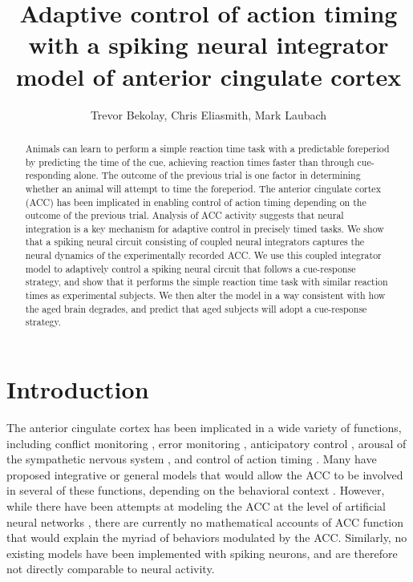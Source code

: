 \documentclass[11pt]{article}
\title{Adaptive control of action timing with a spiking neural integrator
  model of anterior cingulate cortex}
\date{}
\author{Trevor Bekolay, Chris Eliasmith, Mark Laubach}
\begin{document}
\maketitle

\begin{abstract}
  Animals can learn to perform a simple reaction time task
  with a predictable foreperiod
  by predicting the time of the cue,
  achieving reaction times faster
  than through cue-responding alone.
  The outcome of the previous trial
  is one factor in determining
  whether an animal will attempt to time
  the foreperiod.
  The anterior cingulate cortex (ACC) has been implicated
  in enabling control of action timing
  depending on the outcome of the previous trial.
  Analysis of ACC activity suggests that
  neural integration is a key mechanism
  for adaptive control in precisely timed tasks.
  We show that a spiking neural circuit
  consisting of coupled neural integrators
  captures the neural dynamics
  of the experimentally recorded ACC.
  We use this coupled integrator model
  to adaptively control
  a spiking neural circuit that follows
  a cue-response strategy,
  and show that it performs the simple reaction time task
  with similar reaction times as experimental subjects.
  We then alter the model
  in a way consistent with
  how the aged brain degrades,
  and predict that aged subjects
  will adopt a cue-response strategy.
\end{abstract}

\section{Introduction}

The anterior cingulate cortex has been implicated
in a wide variety of functions,
including conflict monitoring
\citep{Aarts2009, Botvinick2004, VanVeen2004},
error monitoring \citep{Brown2005, Carter1998, Fecteau2003,
  Modirrousta2008, Rushworth2004},
anticipatory control \citep{Aarts2008, Koyama2001},
arousal of the sympathetic nervous system
\citep{Critchley2003, Luu2003},
and control of action timing \citep{Muir1996, Mulert2003,
  Naito2013, Narayanan2009, Risterucci2003}.
Many have proposed integrative or general models
that would allow the ACC to be involved
in several of these functions,
depending on the behavioral context
\citep{Botvinick2004, Luu2003}.
However, while there have been
attempts at modeling the ACC at the level
of artificial neural networks
\citep{Botvinick2004, Brown2005},
there are currently no mathematical
accounts of ACC function that would
explain the myriad of behaviors
modulated by the ACC.
Similarly, no existing models
have been implemented with spiking neurons,
and are therefore not directly comparable
to neural activity.
\end{document}
